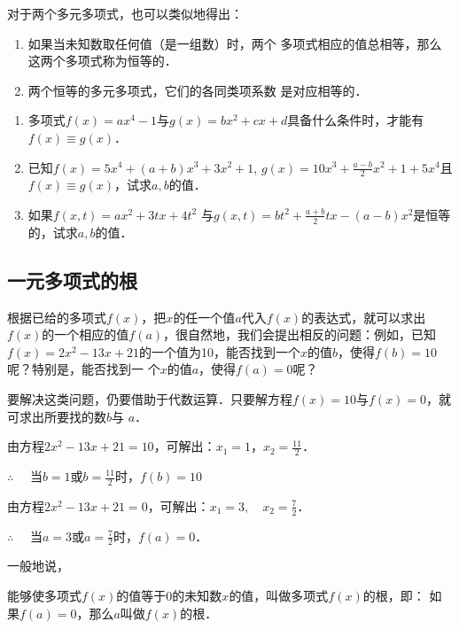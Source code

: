 对于两个多元多项式，也可以类似地得出：
\begin{blk}{}
    \begin{enumerate}
        \item 如果当未知数取任何值（是一组数）时，两个
        多项式相应的值总相等，那么这两个多项式称为恒等的．
        \item 
        两个恒等的多元多项式，它们的各同类项系数
        是对应相等的．
    \end{enumerate}
\end{blk}

\begin{ex}
    \begin{enumerate}
        \item 多项式$f(x)=ax^4-1$与$g(x)=bx^2+cx+d$具备什么条件时，才能有$f(x)\equiv g(x)$．
        \item 已知$f(x)=5x^4+(a+b)x^3+3x^2+1$, $g(x)=10x^3+\frac{a-b}{2}x^2+1+5x^4$且$f(x)\equiv g(x)$，试求$a,b$的值．
        \item 如果$f(x,t)=ax^2+3tx+4t^2$ 与$g(x,t)=bt^2+\frac{a+b}{2}tx-(a-b)x^2$是恒等的，试求$a,b$的值．
    \end{enumerate}
\end{ex}

\subsection{一元多项式的根}

根据已给的多项式$f(x)$，把$x$的任一个值$a$代入$f(x)$的表达式，就可以求出$f(x)$的一个相应的值$f(a)$，很自然地，我们会提出相反的问题：例如，已知$f(x)=2x^2-13x+21$的一个值为10，能否找到一个$x$的值$b$，使得$f(b)=10$呢？特别是，能否找到一
个$x$的值$a$，使得$f(a)=0$呢？

要解决这类问题，仍要借助于代数运算．只要解方程$f(x)=10$与$f(x)=0$，就可求出所要找的数$b$与
$a$．

由方程$2x^2-13x+21=10$，可解出：$x_1=1$，$x_2=\frac{11}{2}$．

$\therefore\quad $ 当$b=1$或$b=\frac{11}{2}$时，$f(b)=10$

由方程$2x^2-13x+21=0$，可解出：$x_1=3,\quad x_2=\frac{7}{2}$．

$\therefore\quad $ 当$a=3$或$a=\frac{7}{2}$时，$f(a)=0$．

一般地说，
\begin{blk}{}
    能够使多项式$f(x)$的值等于0的未知数$x$的值，叫做多项式$f(x)$的根，即：
如果$f(a)=0$，那么$a$叫做$f(x)$的根．
\end{blk}


